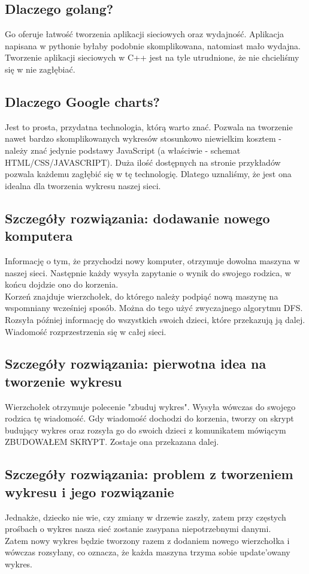 \subsection{Dlaczego golang?}
Go oferuje łatwość tworzenia aplikacji sieciowych oraz wydajność. Aplikacja napisana w pythonie byłaby podobnie skomplikowana, natomiast mało wydajna. Tworzenie aplikacji sieciowych w C++ jest na tyle utrudnione, że nie chcieliśmy się w nie zagłębiać.

\subsection{Dlaczego Google charts?}
Jest to prosta, przydatna technologia, którą warto znać. Pozwala na tworzenie nawet bardzo skomplikowanych wykresów stosunkowo niewielkim kosztem - należy znać jedynie podstawy JavaScript (a właściwie - schemat HTML/CSS/JAVASCRIPT). Duża ilość dostępnych na stronie przykładów pozwala każdemu zagłębić się w tę technologię. Dlatego uznaliśmy, że jest ona idealna dla tworzenia wykresu naszej sieci.

\subsection{Szczegóły rozwiązania: dodawanie nowego komputera}
Informację o tym, że przychodzi nowy komputer, otrzymuje dowolna maszyna w naszej sieci. Następnie każdy wysyła zapytanie o wynik do swojego rodzica, w końcu dojdzie ono do korzenia.\\
\indent Korzeń znajduje wierzchołek, do którego należy podpiąć nową maszynę na wspomniany wcześniej sposób. Można do tego użyć zwyczajnego algorytmu DFS.\\
\indent Rozsyła później informację do wszystkich swoich dzieci, które przekazują ją dalej. Wiadomość rozprzestrzenia się w całej sieci.


\subsection{Szczegóły rozwiązania: pierwotna idea na tworzenie wykresu}
Wierzchołek otrzymuje polecenie "zbuduj wykres". Wysyła wówczas do swojego rodzica tę wiadomość. Gdy wiadomość dochodzi do korzenia, tworzy on skrypt budujący wykres oraz rozsyła go do swoich dzieci z komunikatem mówiącym ZBUDOWAŁEM SKRYPT. Zostaje ona przekazana dalej.\\

\subsection{Szczegóły rozwiązania: problem z tworzeniem wykresu i jego rozwiązanie}
Jednakże, dziecko nie wie, czy zmiany w drzewie zaszły, zatem przy częstych prośbach o wykres nasza sieć zostanie zasypana niepotrzebnymi danymi.\\
\indent Zatem nowy wykres będzie tworzony razem z dodaniem nowego wierzchołka i wówczas rozsyłany, co oznacza, że każda maszyna trzyma sobie update'owany wykres.

